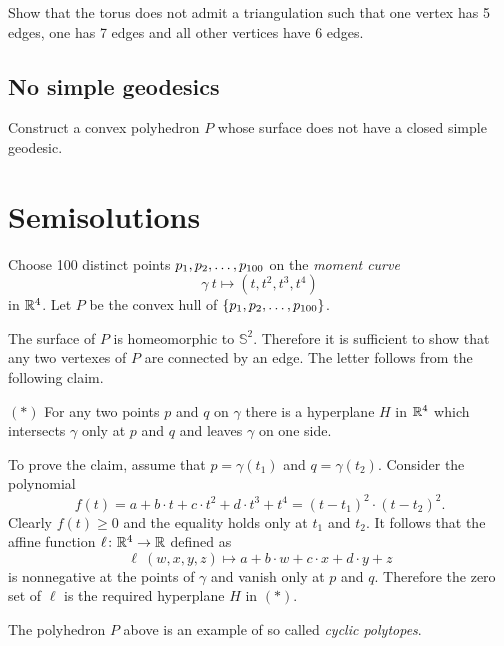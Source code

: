 \begin{pr}
Show that the torus does not admit a triangulation 
such that one vertex has 5 edges,
one has 7 edges and 
all other vertices have 
6 edges. 
\end{pr}


\subsection*{No simple geodesics\easy}\label{No simple geodesics}

\begin{pr}
Construct a convex polyhedron $P$ whose surface 
does not have a closed simple geodesic.
\end{pr}

\section*{Semisolutions}


Choose 100 distinct points $p_1,p_2,\z\dots,p_{100}$
on the {}\emph{moment curve} 
\[\gamma\:t\mapsto (t,t^2,t^3,t^4)\] 
in $\mathbb{R}^4$.
Let $P$ be the convex hull of $\{p_1,p_2,\z\dots,p_{100}\}$.

The surface of $P$ is homeomorphic to $\mathbb{S}^2$.
Therefore it is sufficient to show that any two vertexes of $P$ are connected by an edge.
The letter follows from the following claim.

\begin{cl}{$({*})$}
For any two points $p$ and $q$ on $\gamma$ there is a hyperplane $H$ in $\mathbb{R}^4$ which intersects $\gamma$ only at $p$ and $q$ and leaves $\gamma$ on one side.
\end{cl}

To prove the claim, assume that $p=\gamma(t_1)$ and $q=\gamma(t_2)$. 
Consider the polynomial
\[f(t)=a+b\cdot t+c\cdot t^2+d\cdot t^3+t^4=(t-t_1)^2\cdot(t-t_2)^2.\]
Clearly $f(t)\ge 0$ and the equality holds only at $t_1$ and $t_2$.
It follows that the affine function $\ell\colon\mathbb{R}^4\to\mathbb{R}$ defined as 
\[\ell\:(w,x,y,z)\mapsto a+b\cdot w+c\cdot x+d\cdot y+z\]
is nonnegative at the points of $\gamma$ and vanish only at $p$ and $q$.
Therefore the zero set of $\ell$ is the required hyperplane $H$ in $({*})$. 
\qeds

The polyhedron $P$ above is an example 
of so called \emph{cyclic polytopes}.

